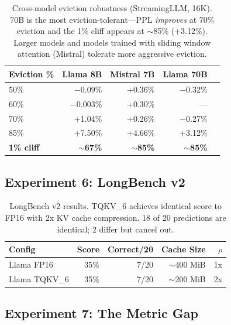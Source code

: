 \begin{table}[h]
\centering
\begin{tabular}{lrrrr}
\toprule
\textbf{Eviction \%} & \textbf{Llama 8B} & \textbf{Mistral 7B} & \textbf{Llama 70B} \\
\midrule
50\% & $-$0.09\% & +0.36\% & $-$0.32\% \\
60\% & $-$0.003\% & +0.30\% & --- \\
70\% & +1.04\% & +0.26\% & $-$0.27\% \\
85\% & +7.50\% & +4.66\% & +3.12\% \\
\midrule
\textbf{1\% cliff} & \textbf{$\sim$67\%} & \textbf{$\sim$85\%} & \textbf{$\sim$85\%} \\
\bottomrule
\end{tabular}
\caption{Cross-model eviction robustness (StreamingLLM, 16K). 70B is the most eviction-tolerant---PPL \emph{improves} at 70\% eviction and the 1\% cliff appears at $\sim$85\% (+3.12\%). Larger models and models trained with sliding window attention (Mistral) tolerate more aggressive eviction.}
\label{tab:cross-model-eviction}
\end{table}

\subsection{Experiment 6: LongBench v2}
\label{sec:exp-longbench}

\begin{table}[h]
\centering
\begin{tabular}{lrrrr}
\toprule
\textbf{Config} & \textbf{Score} & \textbf{Correct/20} & \textbf{Cache Size} & \textbf{$\rho$} \\
\midrule
Llama FP16 & 35\% & 7/20 & $\sim$400 MiB & 1x \\
Llama TQKV\_6 & 35\% & 7/20 & $\sim$200 MiB & 2x \\
\bottomrule
\end{tabular}
\caption{LongBench v2 results. TQKV\_6 achieves identical score to FP16 with 2x KV cache compression. 18 of 20 predictions are identical; 2 differ but cancel out.}
\label{tab:longbench}
\end{table}

\subsection{Experiment 7: The Metric Gap}
\label{sec:exp-metric-gap}

